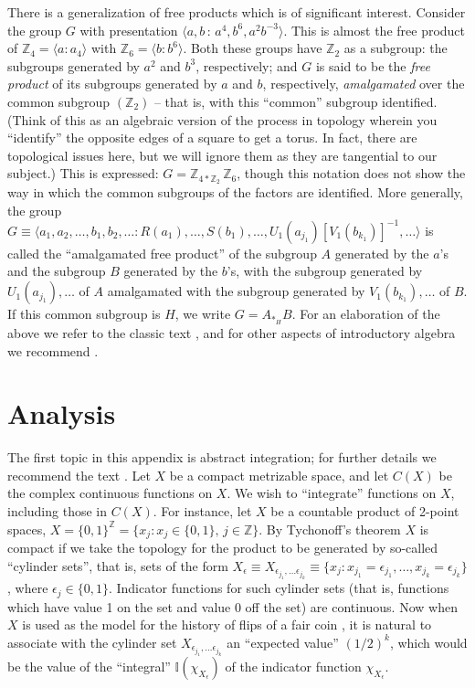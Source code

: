 \documentclass[reqno]{stml-l}
\theoremstyle{plain}
\theoremstyle{definition}
\numberwithin{equation}{chapter}
\begin{document}
There is a generalization of free products which is of significant interest. Consider the group $G$ with presentation $\langle a,b\,:\,a^{4},b^{6}, a^{2}b^{-3}\rangle$. This is almost the free product of $\mathbb{Z}_{4}=\langle a: a_{4}\rangle$ with $\mathbb{Z}_{6}=\langle b: b^{6}\rangle$. Both these groups have $\mathbb{Z}_{2}$ as a subgroup: the subgroups generated by $a^{2}$ and $b^{3}$, respectively; and $G$ is said to be the \emph{free product} of its subgroups generated by $a$ and $b$, respectively, \emph{amalgamated} over the common subgroup $(\mathbb{Z}_{2})$ -- that is, with this ``common'' subgroup identified. (Think of this as an algebraic version of the process in topology wherein you ``identify'' the opposite edges of a square to get a torus. In fact, there are topological issues here, but we will ignore them as they are tangential to our subject.) This is expressed: $G=\mathbb{Z}_{4\ast \mathbb{Z}_{2}}\,\mathbb{Z}_{6}$, though this notation does not show the way in which the common subgroups of the factors are identified. More generally, the group $G\equiv \langle a_{1},a_{2},\ldots,b_{1},b_{2},\ldots:R(a_{1}),\ldots,S(b_{1}),\ldots,U_{1}(a_{j_{1}})[V_{1}(b_{k_{1}})]^{-1},\ldots\rangle$ is called the ``amalgamated free product'' of the subgroup $A$ generated by the $a$'s and the subgroup $B$ generated by the $b$'s, with the subgroup generated by $U_{1}(a_{j_{1}}),\ldots$ of $A$ amalgamated with the subgroup generated by $V_{1}(b_{k_{1}}),\ldots$ of $B$. If this common subgroup is $H$, we write $G=A_{\ast_{H}} B$. For an elaboration of the above we refer to the classic text \cite{bib:MKS}, and for other aspects of introductory algebra we recommend \cite{bib:Her}.


\chapter{Analysis \label{appIII:appIII}}

The first topic in this appendix is abstract integration; for further details we recommend the text \cite{bib:Tay}. Let $X$ be a compact metrizable space, and let $C(X)$ be the complex continuous functions on $X$. We wish to ``integrate'' functions on $X$, including those in $C(X)$. For instance, let $X$ be a countable product of 2-point spaces, $X=\{0,1\}^{\mathbb{Z}}= \{x_{j}:x_{j}\in\{0,1\},\,j\in \mathbb{Z}\}$. By Tychonoff's theorem $X$ is compact if we take the topology for the product to be generated by so-called ``cylinder sets'', that is, sets of the form $X_{\epsilon}\equiv X_{\epsilon_{j_{1}},\ldots\epsilon_{j_{k}}}\equiv\{x_{j}:x_{j_{1}}= \epsilon_{j_{1}},\ldots,x_{j_{k}}=\epsilon_{j_{k}}\}$, where $\epsilon_{j}\in\{0,1\}$. Indicator functions for such cylinder sets (that is, functions which have value 1 on the set and value $0$ off the set) are continuous. Now when $X$ is used as the model for the history of flips of a fair coin \cite{bib:Bil}, it is natural to associate with the cylinder set $X_{\epsilon_{j_{1}},\ldots\epsilon_{j_{k}}}$ an ``expected value'' $(1/2)^{k}$, which would be the value of the ``integral'' $\mathbb{I}(\chi_{X_{\epsilon}})$ of the indicator function $\chi_{X_{\epsilon}}$.
\end{document}
